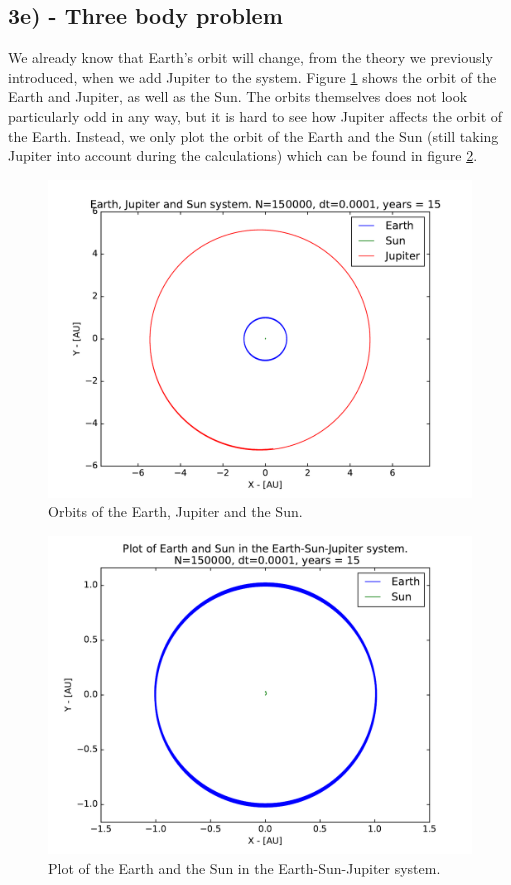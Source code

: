 \documentclass[12pt]{article}
\begin{document}
\subsection*{3e) - Three body problem}
We already know that Earth's orbit will change, from the theory we previously introduced, when we add Jupiter to the system. Figure \ref{fig:EJS_2D_Orbit} shows the orbit of the Earth and Jupiter, as well as the Sun. The orbits themselves does not look particularly odd in any way, but it is hard to see how Jupiter affects the orbit of the Earth. Instead, we only plot the orbit of the Earth and the Sun (still taking Jupiter into account during the calculations) which can be found in figure \ref{fig:EJS_Earth_and_sun}. 

\begin{figure}[!h]
\centering
\includegraphics[width=\linewidth]{Plots/Earth_Sun_Jupiter.pdf}
\caption{Orbits of the Earth, Jupiter and the Sun.}
\label{fig:EJS_2D_Orbit}
\end{figure}

\begin{figure}[!h]
\centering
\includegraphics[width=\linewidth]{Plots/ESJ_EarthandSun.pdf}
\caption{Plot of the Earth and the Sun in the Earth-Sun-Jupiter system.}
\label{fig:EJS_Earth_and_sun}
\end{figure}
\end{document}
